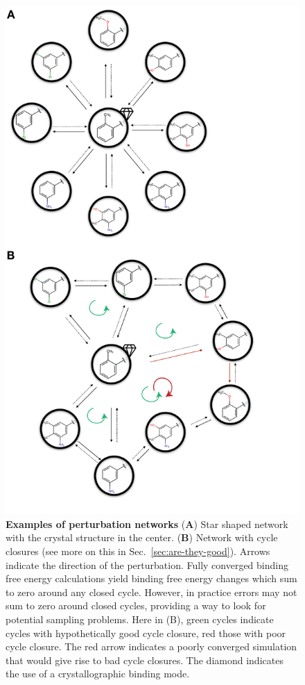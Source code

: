 \documentclass[9pt,bestpractices]{livecoms}
\begin{document}
\begin{figure}
    \includegraphics[width=0.95\columnwidth]{figures/fig6_types_of_networks/Figure.pdf}
    \caption{\textbf{Examples of perturbation networks} (\textbf{A}) Star shaped network with the crystal structure in the center. (\textbf{B}) Network with cycle closures (see more on this in Sec.~\ref{sec:are-they-good}). Arrows indicate the direction of the perturbation. Fully converged binding free energy calculations yield binding free energy changes which sum to zero around any closed cycle. However, in practice errors may not sum to zero around closed cycles, providing a way to look for potential sampling problems. Here in (B), green cycles indicate cycles with hypothetically good cycle closure, red those with poor cycle closure. The red arrow indicates a poorly converged simulation that would give rise to bad cycle closures. The diamond indicates the use of a crystallographic binding mode.}
    \label{fig:fig_types_of_networks}
\end{figure} 
\end{document}
